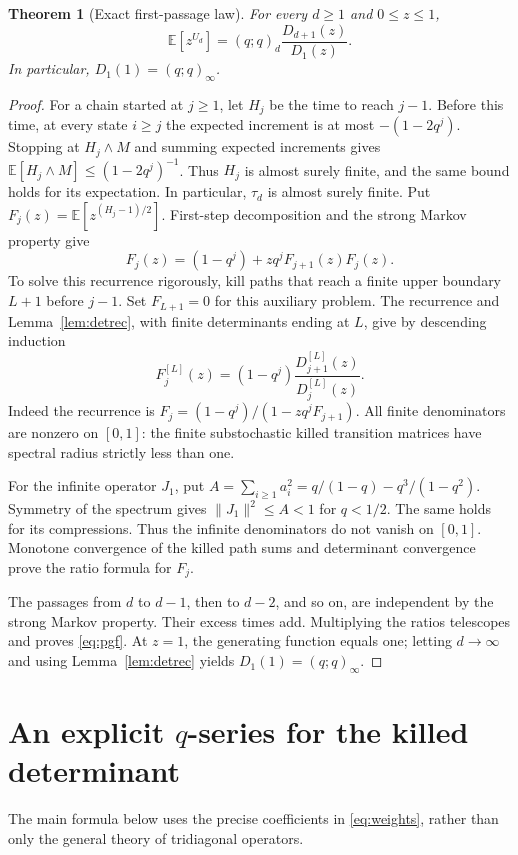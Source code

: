 \documentclass[11pt]{article}
\newtheorem{theorem}{Theorem}[section]
\theoremstyle{definition}\newtheorem{definition}[theorem]{Definition}
\newcommand{\Exp}{\mathbb E}
\begin{document}
\begin{theorem}[Exact first-passage law]\label{thm:pgf}
For every $d\geq1$ and $0\leq z\leq1$,
\begin{equation}\label{eq:pgf}
 \boxed{\Exp[z^{U_d}]=(q;q)_d\frac{D_{d+1}(z)}{D_1(z)}.}
\end{equation}
In particular, $D_1(1)=(q;q)_\infty$.
\end{theorem}
\begin{proof}
For a chain started at $j\geq1$, let $H_j$ be the time to reach $j-1$. Before this time, at every state $i\geq j$ the expected increment is at most $-(1-2q^j)$. Stopping at $H_j\wedge M$ and summing expected increments gives $\Exp[H_j\wedge M]\leq(1-2q^j)^{-1}$. Thus $H_j$ is almost surely finite, and the same bound holds for its expectation. In particular, $\tau_d$ is almost surely finite. Put $F_j(z)=\Exp[z^{(H_j-1)/2}]$. First-step decomposition and the strong Markov property give
\[
 F_j(z)=(1-q^j)+zq^jF_{j+1}(z)F_j(z).
\]
To solve this recurrence rigorously, kill paths that reach a finite upper boundary $L+1$ before $j-1$. Set $F_{L+1}=0$ for this auxiliary problem. The recurrence and Lemma~\ref{lem:detrec}, with finite determinants ending at $L$, give by descending induction
\[
 F_j^{[L]}(z)=(1-q^j)\frac{D_{j+1}^{[L]}(z)}{D_j^{[L]}(z)}.
\]
Indeed the recurrence is $F_j=(1-q^j)/(1-zq^jF_{j+1})$. All finite denominators are nonzero on $[0,1]$: the finite substochastic killed transition matrices have spectral radius strictly less than one.

For the infinite operator $J_1$, put $A=\sum_{i\geq1}a_i^2=q/(1-q)-q^3/(1-q^2)$. Symmetry of the spectrum gives $\|J_1\|^2\leq A<1$ for $q<1/2$. The same holds for its compressions. Thus the infinite denominators do not vanish on $[0,1]$. Monotone convergence of the killed path sums and determinant convergence prove the ratio formula for $F_j$.

The passages from $d$ to $d-1$, then to $d-2$, and so on, are independent by the strong Markov property. Their excess times add. Multiplying the ratios telescopes and proves \eqref{eq:pgf}. At $z=1$, the generating function equals one; letting $d\to\infty$ and using Lemma~\ref{lem:detrec} yields $D_1(1)=(q;q)_\infty$.
\end{proof}

\section{An explicit \texorpdfstring{$q$}{q}-series for the killed determinant}
The main formula below uses the precise coefficients in \eqref{eq:weights}, rather than only the general theory of tridiagonal operators.
\end{document}
